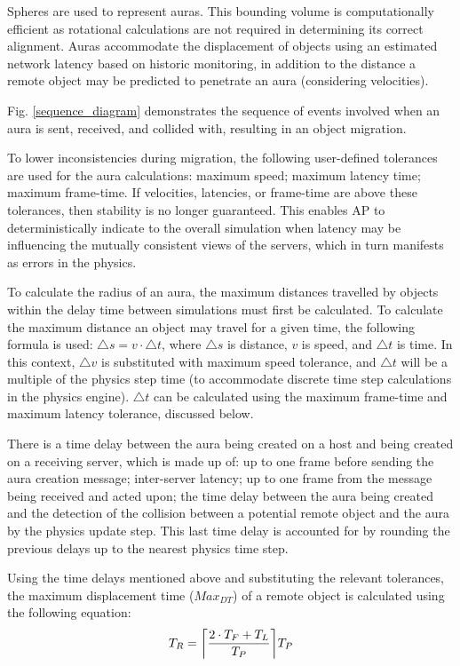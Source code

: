 Spheres are used to represent auras. This bounding volume is computationally efficient as rotational calculations are not required in determining its correct alignment. Auras accommodate the displacement of objects using an estimated network latency based on historic monitoring, in addition to the distance a remote object may be predicted to penetrate an aura (considering velocities).

Fig. \ref{sequence_diagram} demonstrates the sequence of events involved when an aura is sent, received, and collided with, resulting in an object migration.

To lower inconsistencies during migration, the following user-defined tolerances are used for the aura calculations: maximum speed; maximum latency time; maximum frame-time. If velocities, latencies, or frame-time are above these tolerances, then stability is no longer guaranteed. This enables AP to deterministically indicate to the overall simulation when latency may be influencing the mutually consistent views of the servers, which in turn manifests as errors in the physics.

To calculate the radius of an aura, the maximum distances travelled by objects within the delay time between simulations must first be calculated. To calculate the maximum distance an object may travel for a given time, the following formula is used: $\triangle s=v\cdot \triangle t$, where $ \triangle s$ is distance, $v$ is speed, and $ \triangle t$ is time. In this context, $ \triangle v$ is substituted with maximum speed tolerance, and $ \triangle t$ will be a multiple of the physics step time (to accommodate discrete time step calculations in the physics engine). $ \triangle t$ can be calculated using the maximum frame-time and maximum latency tolerance, discussed below.

There is a time delay between the aura being created on a host and being created on a receiving server, which is made up of: up to one frame before sending the aura creation message; inter-server latency; up to one frame from the message being received and acted upon; the time delay between the aura being created and the detection of the collision between a potential remote object and the aura by the physics update step. This last time delay is accounted for by rounding the previous delays up to the nearest physics time step.

Using the time delays mentioned above and substituting the relevant tolerances, the maximum displacement time ($Max_{DT}$) of a remote object is calculated using the following equation:
\DeclarePairedDelimiter\ceil{\lceil}{\rceil}
\begin{equation}
T_{R}=\ceil*{\frac{2\cdot T_{F} + T_{L}}{T_{P}}}T_{P}
\end{equation}

